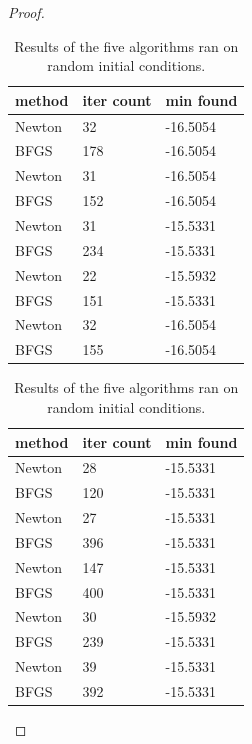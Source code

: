 \documentclass[12pt]{report}
\begin{document}
\begin{problem}
\begin{proof}
\begin{table}[h!]
    \centering
    \begin{tabular}{l l l}
    method & iter count& min found \\
    \hline
    Newton & 32 & -16.5054 \\
    BFGS & 178 & -16.5054 \\
    \hline
    Newton & 31 & -16.5054 \\
    BFGS & 152 & -16.5054 \\
    \hline
    Newton & 31 & -15.5331 \\
    BFGS & 234 & -15.5331 \\
    \hline
    Newton & 22 & -15.5932 \\
    BFGS & 151 & -15.5331 \\    
    \hline
    Newton & 32 & -16.5054 \\
    BFGS & 155 & -16.5054 \\
    \hline
    \end{tabular}
    \quad %
    \begin{tabular}{l l l}
    method & iter count& min found \\
    \hline
    Newton & 28 & -15.5331 \\
    BFGS & 120 & -15.5331 \\
    \hline
    Newton & 27 & -15.5331 \\
    BFGS & 396 & -15.5331 \\
    \hline
    Newton & 147 & -15.5331 \\
    BFGS & 400 & -15.5331 \\
    \hline
    Newton & 30 & -15.5932 \\
    BFGS & 239 & -15.5331 \\
    \hline
    Newton & 39 & -15.5331 \\
    BFGS & 392 & -15.5331 \\    \hline
    \end{tabular}
    \caption{Results of the five algorithms ran on random initial conditions.}
    \label{table:lots of data}
\end{table}


\end{proof}
\end{problem}
\end{document}

